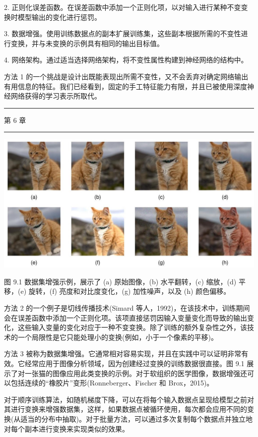 \documentclass[10pt]{article}
\newcommand{\HRule}{\begin{center}\rule{0.9\linewidth}{0.2mm}\end{center}}
\begin{document}
2. 正则化误差函数。在误差函数中添加一个正则化项，以对输入进行某种不变变换时模型输出的变化进行惩罚。

3. 数据增强。使用训练数据点的副本扩展训练集，这些副本根据所需的不变性进行变换，并与未变换的示例具有相同的输出目标值。

4. 网络架构。通过适当选择网络架构，将不变性属性构建到神经网络的结构中。

方法 1 的一个挑战是设计出既能表现出所需不变性，又不会丢弃对确定网络输出有用信息的特征。我们已经看到，固定的手工特征能力有限，并且已被使用深度神经网络获得的学习表示所取代。

\HRule

第 6 章

\HRule

\begin{center}
\includegraphics[max width=1.0\textwidth]{images/0194e279-9b28-703a-88f4-c3ac21e2010d_277_227_355_1286_661_0.jpg}
\end{center}
\hspace*{3em} 

图 9.1 数据集增强示例，展示了 (a) 原始图像，(b) 水平翻转，(c) 缩放，(d) 平移，(e) 旋转，(f) 亮度和对比度变化，(g) 加性噪声，以及 (h) 颜色偏移。

方法 2 的一个例子是切线传播技术(Simard 等人，1992)，在该技术中，训练期间会在误差函数中添加一个正则化项。该项直接惩罚因输入变量变化而导致的输出变化，这些输入变量的变化对应于一种不变变换。除了训练的额外复杂性之外，该技术的一个局限性是它只能处理小的变换(例如，小于一个像素的平移)。

方法 3 被称为数据集增强。它通常相对容易实现，并且在实践中可以证明非常有效。它经常应用于图像分析领域，因为创建经过变换的训练数据很直接。图 9.1 展示了对一张猫的图像应用此类变换的示例。对于软组织的医学图像，数据增强还可以包括连续的“橡胶片”变形(Ronneberger、Fischer 和 Brox，2015)。

对于顺序训练算法，如随机梯度下降，可以在将每个输入数据点呈现给模型之前对其进行变换来增强数据集，这样，如果数据点被循环使用，每次都会应用不同的变换(从适当的分布中抽取)。对于批量方法，可以通过多次复制每个数据点并独立地对每个副本进行变换来实现类似的效果。
\end{document}
